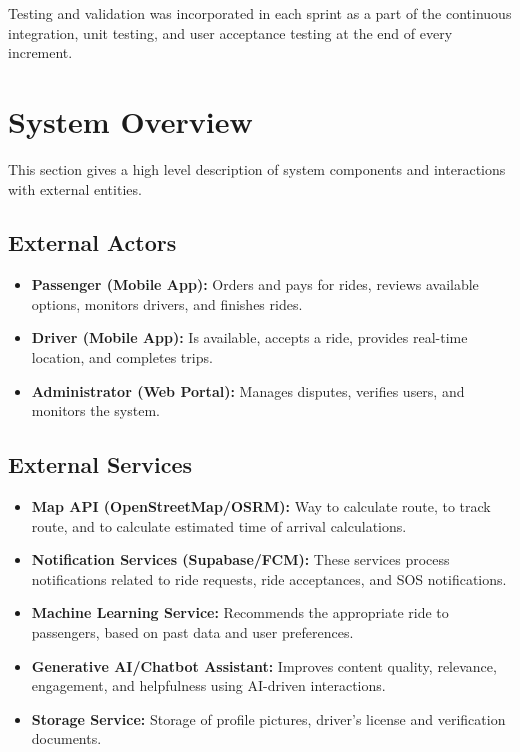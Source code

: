 Testing and validation was incorporated in each sprint as a part of the continuous integration, unit testing, and user acceptance testing at the end of every increment.

\section{System Overview}

This section gives a high level description of system components and interactions with external entities.

\subsection{External Actors}

\begin{itemize}
    \item \textbf{Passenger (Mobile App):} Orders and pays for rides, reviews available options, monitors drivers, and finishes rides.
    \item \textbf{Driver (Mobile App):} Is available, accepts a ride, provides real-time location, and completes trips.
    \item \textbf{Administrator (Web Portal):} Manages disputes, verifies users, and monitors the system.
\end{itemize}

\subsection{External Services}

\begin{itemize}
    \item \textbf{Map API (OpenStreetMap/OSRM):} Way to calculate route, to track route, and to calculate estimated time of arrival calculations.
    \item \textbf{Notification Services (Supabase/FCM):} These services process notifications related to ride requests, ride acceptances, and SOS notifications.
    \item \textbf{Machine Learning Service:} Recommends the appropriate ride to passengers, based on past data and user preferences.
    \item \textbf{Generative AI/Chatbot Assistant:} Improves content quality, relevance, engagement, and helpfulness using AI-driven interactions.
    \item \textbf{Storage Service:} Storage of profile pictures, driver's license and verification documents.
\end{itemize}

